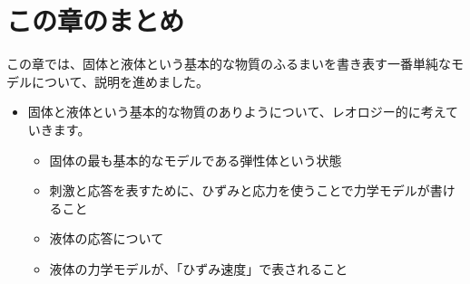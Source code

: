 \documentclass[uplatex,dvipdfmx,a4paper,11pt]{jsreport}
\begin{document}
\section*{この章のまとめ}

この章では、固体と液体という基本的な物質のふるまいを書き表す一番単純なモデルについて、説明を進めました。
	\begin{boxnote}
		\large
		\begin{itemize}
			\item 固体と液体という基本的な物質のありようについて、レオロジー的に考えていきます。
			\begin{itemize}
				\item 固体の最も基本的なモデルである弾性体という状態
				\item 刺激と応答を表すために、ひずみと応力を使うことで力学モデルが書けること
				\item 液体の応答について
				\item 液体の力学モデルが、「ひずみ速度」で表されること
			\end{itemize} 
		\end{itemize}
	\end{boxnote}

	\newpage
\end{document}
